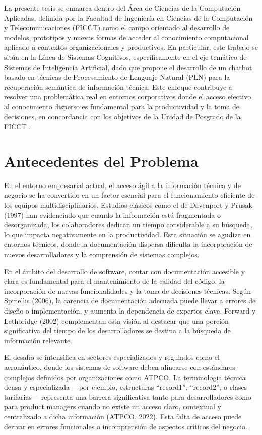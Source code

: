 La presente tesis se enmarca dentro del Área de Ciencias de la Computación Aplicadas, definida por la Facultad de Ingeniería en Ciencias de la Computación y Telecomunicaciones (FICCT) como el campo orientado al desarrollo de modelos, prototipos y nuevas formas de acceder al conocimiento computacional aplicado a contextos organizacionales y productivos. En particular, este trabajo se sitúa en la Línea de Sistemas Cognitivos, específicamente en el eje temático de Sistemas de Inteligencia Artificial, dado que propone el desarrollo de un chatbot basado en técnicas de Procesamiento de Lenguaje Natural (PLN) para la recuperación semántica de información técnica. Este enfoque contribuye a resolver una problemática real en entornos corporativos donde el acceso efectivo al conocimiento disperso es fundamental para la productividad y la toma de decisiones, en concordancia con los objetivos de la Unidad de Posgrado de la FICCT \parencite{ficct2022lineas}.


\section{Antecedentes del Problema}

En el entorno empresarial actual, el acceso ágil a la información técnica y de negocio se ha convertido en un factor esencial para el funcionamiento eficiente de los equipos multidisciplinarios. Estudios clásicos como el de Davenport y Prusak (1997) han evidenciado que cuando la información está fragmentada o desorganizada, los colaboradores dedican un tiempo considerable a su búsqueda, lo que impacta negativamente en la productividad. Esta situación se agudiza en entornos técnicos, donde la documentación dispersa dificulta la incorporación de nuevos desarrolladores y la comprensión de sistemas complejos.

En el ámbito del desarrollo de software, contar con documentación accesible y clara es fundamental para el mantenimiento de la calidad del código, la incorporación de nuevas funcionalidades y la toma de decisiones técnicas. Según Spinellis (2006), la carencia de documentación adecuada puede llevar a errores de diseño o implementación, y aumenta la dependencia de expertos clave. Forward y Lethbridge (2002) complementan esta visión al destacar que una porción significativa del tiempo de los desarrolladores se destina a la búsqueda de información relevante.

El desafío se intensifica en sectores especializados y regulados como el aeronáutico, donde los sistemas de software deben alinearse con estándares complejos definidos por organizaciones como ATPCO. La terminología técnica densa y especializada —por ejemplo, estructuras “record1”, “record2”, o clases tarifarias— representa una barrera significativa tanto para desarrolladores como para product managers cuando no existe un acceso claro, contextual y centralizado a dicha información (ATPCO, 2022). Esta falta de acceso puede derivar en errores funcionales o incomprensión de aspectos críticos del negocio.

